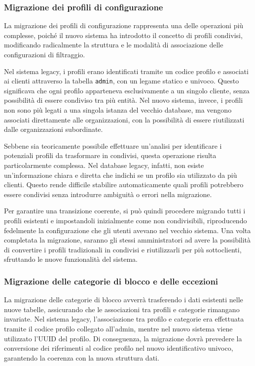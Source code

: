 \subsubsection{Migrazione dei profili di configurazione}
La migrazione dei profili di configurazione rappresenta una delle operazioni più complesse, poiché il nuovo sistema ha introdotto il concetto di profili condivisi, modificando radicalmente la struttura e le modalità di associazione delle configurazioni di filtraggio.

Nel sistema legacy, i profili erano identificati tramite un codice profilo e associati ai clienti attraverso la tabella \texttt{admin}, con un legame statico e univoco. Questo significava che ogni profilo apparteneva esclusivamente a un singolo cliente, senza possibilità di essere condiviso tra più entità. Nel nuovo sistema, invece, i profili non sono più legati a una singola istanza del vecchio database, ma vengono associati direttamente alle organizzazioni, con la possibilità di essere riutilizzati dalle organizzazioni subordinate.

Sebbene sia teoricamente possibile effettuare un'analisi per identificare i potenziali profili da trasformare in condivisi, questa operazione risulta particolarmente complessa. Nel database legacy, infatti, non esiste un'informazione chiara e diretta che indichi se un profilo sia utilizzato da più clienti. Questo rende difficile stabilire automaticamente quali profili potrebbero essere condivisi senza introdurre ambiguità o errori nella migrazione.

Per garantire una transizione coerente, si può quindi procedere migrando tutti i profili esistenti e impostandoli inizialmente come non condivisibili, riproducendo fedelmente la configurazione che gli utenti avevano nel vecchio sistema. Una volta completata la migrazione, saranno gli stessi amministratori ad avere la possibilità di convertire i profili tradizionali in condivisi e riutilizzarli per più sottoclienti, sfruttando le nuove funzionalità del sistema.

\subsubsection{Migrazione delle categorie di blocco e delle eccezioni}
La migrazione delle categorie di blocco avverrà trasferendo i dati esistenti nelle nuove tabelle, assicurando che le associazioni tra profili e categorie rimangano invariate. Nel sistema legacy, l'associazione tra profilo e categorie era effettuata tramite il codice profilo collegato all'admin, mentre nel nuovo sistema viene utilizzato l'UUID del profilo. Di conseguenza, la migrazione dovrà prevedere la conversione dei riferimenti al codice profilo nel nuovo identificativo univoco, garantendo la coerenza con la nuova struttura dati.

